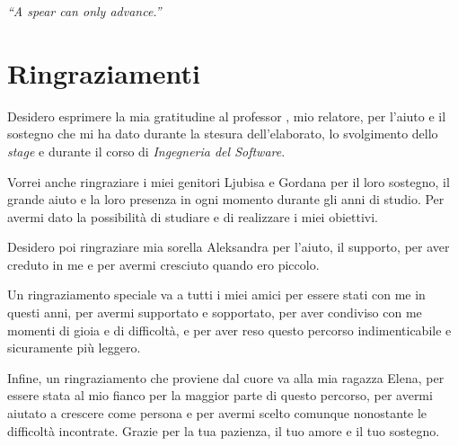 \cleardoublepage
{}
{}

 \begin{flushright}{
     \slshape
     ``A spear can only advance.''} \\
     \medskip
     
 \end{flushright}

\begingroup
\let\clearpage\relax
\let\cleardoublepage\relax
\let\cleardoublepage\relax

\chapter*{Ringraziamenti}

\noindent Desidero esprimere la mia gratitudine al professor \myProf, mio relatore, per l'aiuto e il sostegno che mi ha dato durante la stesura dell'elaborato, lo svolgimento dello \textit{stage} e durante il corso di \textit{Ingegneria del Software}.

\vspace{0.35cm}

\noindent Vorrei anche ringraziare i miei genitori Ljubisa e Gordana per il loro sostegno, il grande aiuto e la loro presenza in ogni momento durante gli anni di studio. Per avermi dato la possibilità di studiare e di realizzare i miei obiettivi.

\vspace{0.35cm}

\noindent Desidero poi ringraziare mia sorella Aleksandra per l'aiuto, il supporto, per aver creduto in me e per avermi cresciuto quando ero piccolo.

\vspace{0.75cm}

\noindent Un ringraziamento speciale va a tutti i miei amici per essere stati con me in questi anni, per avermi supportato e sopportato, per aver condiviso con me momenti di gioia e di difficoltà, e per aver reso questo percorso indimenticabile e sicuramente più leggero.

\vspace{0.35cm}

\noindent Infine, un ringraziamento che proviene dal cuore va alla mia ragazza Elena, per essere stata al mio fianco per la maggior parte di questo percorso, per avermi aiutato a crescere come persona e per avermi scelto comunque nonostante le difficoltà incontrate. Grazie per la tua pazienza, il tuo amore e il tuo sostegno.
\hfill \textit{\myName}

\endgroup
